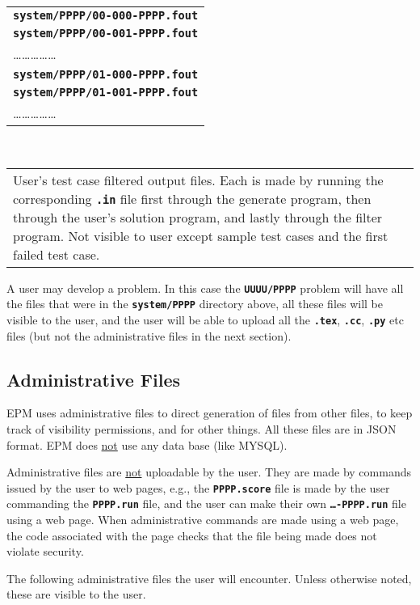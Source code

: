 \documentclass[12pt]{article}
\newcommand{\TT}[1]{{\tt \bfseries #1}}
\newenvironment{indpar}[1][0.4in]%
	{\begin{list}{}%
		     {\setlength{\itemsep}{0in}%
		      \setlength{\topsep}{0in}%
		      \setlength{\parsep}{1ex}%
		      \setlength{\labelwidth}{#1}%
		      \setlength{\leftmargin}{#1}%
		      \addtolength{\leftmargin}{\labelsep}}%
	 \item}%
	{\end{list}}
\newcommand{\ITEM}{\hspace*{-0.2in}}
\begin{document}
\begin{indpar}
\ITEM\begin{tabular}[t]{@{}l}
     \TT{system/PPPP/00-000-PPPP.fout} \\
     \TT{system/PPPP/00-001-PPPP.fout} \\
     \ldots\ldots\ldots\ldots\ldots \\
     \TT{system/PPPP/01-000-PPPP.fout} \\
     \TT{system/PPPP/01-001-PPPP.fout} \\
     \ldots\ldots\ldots\ldots\ldots \\
     \end{tabular}
     ~~~~
     \begin{tabular}[t]{p{3in}}
     User's test case filtered output files.  Each is made by running
     the corresponding \TT{.in} file first through the generate
     program, then through the user's solution program, and lastly
     through the filter program.
     Not visible to user except sample test cases and the first failed
     test case.
     \end{tabular}
\end{indpar}

A user may develop a problem.  In this case the \TT{UUUU/PPPP} problem
will have all the files that were in the \TT{system/PPPP} directory
above, all these files will be visible to the user, and the user
will be able to upload all the \TT{.tex}, \TT{.cc}, \TT{.py} etc
files (but not the administrative files in the next section).

\subsection{Administrative Files}

EPM uses administrative files to direct generation of files from
other files, to keep track of visibility
permissions, and for other things.  All these files are in JSON
format.  EPM does \underline{not} use any data base (like MYSQL).

Administrative files are \underline{not} uploadable by the user.
They are made by commands issued by the user to web pages, e.g.,
the \TT{PPPP.score} file is made by the user commanding
the \TT{PPPP.run} file, and the user can make their own
\TT{\ldots-PPPP.run} file using a web page.  When administrative
commands are made using a web page, the code associated with the
page checks that the file being made does not violate security.

The following administrative files the user will encounter.
Unless otherwise noted, these are visible to the user.
\end{document}
